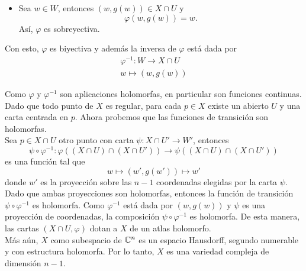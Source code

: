 \begin{example}
\begin{itemize}
\begin{align*}
			\varphi(x)&=\varphi(x')\\
			w&=w'
		\end{align*}
		De esta forma, $z=z'$ y por tanto $x=x'$. Esto significa que $\varphi$ es inyectiva.
		\item Sea $w\in W$, entonces $(w,g(w))\in X\cap U$ y
		\begin{equation*}
			\varphi(w,g(w))=w.
		\end{equation*}
		Así, $\varphi$ es sobreyectiva.
	\end{itemize}
	Con esto, $\varphi$ es biyectiva y además la inversa de $\varphi$ está dada por
	\begin{align*}
		\varphi^{-1}:W\to X\cap U\\
		w\mapsto (w,g(w))
	\end{align*}
	
	Como $\varphi$ y $\varphi^{-1}$ son aplicaciones holomorfas, en particular son funciones continuas.
	Dado que todo punto de $X$ es regular, para cada $p\in X$ existe un abierto $U$ y una carta centrada en $p$. Ahora probemos que las funciones de transición son holomorfas.\\
	Sea $p\in X\cap U$ otro punto con carta $\psi:X\cap U'\to W'$, entonces
	\begin{equation*}
		\psi\circ\varphi^{-1}:\varphi((X\cap U)\cap(X\cap U'))\to\psi((X\cap U)\cap(X\cap U'))
	\end{equation*}
	es una función tal que 
	\begin{equation*}
		w\mapsto (w',g(w'))\mapsto w'
	\end{equation*}
	donde $w'$ es la proyección sobre las $n-1$ coordenadas elegidas por la carta $\psi$. Dado que ambas proyecciones son holomorfas, entonces la función de transición $\psi\circ\varphi^{-1}$ es holomorfa. Como $\varphi^{-1}$ está dada por $(w,g(w))$ y $\psi$ es una proyección de coordenadas, la composición $\psi\circ\varphi^{-1}$ es holomorfa.
	De esta manera, las cartas $(X\cap U,\varphi)$ dotan a $X$ de un atlas holomorfo.\\
	Más aún, $X$ como subespacio de $\mathbb{C}^n$ es un espacio Hausdorff, segundo numerable y con estructura holomorfa. Por lo tanto, $X$ es una variedad compleja de dimensión $n-1$.
\end{example}

